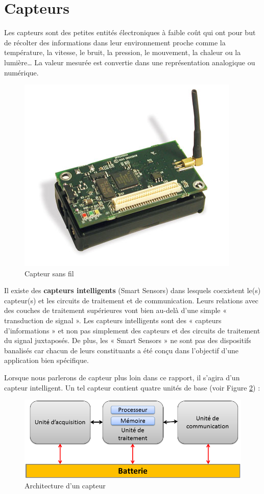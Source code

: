 \section{Capteurs}

Les capteurs sont des petites entités électroniques à faible coût qui ont pour but de récolter des informations dans leur environnement proche comme la température, la vitesse, le bruit, la pression, le mouvement, la chaleur ou la lumière… La valeur mesurée est convertie dans une représentation analogique ou numérique.

\begin{figure}[h]
\centering
\includegraphics[scale=0.3]{Intro/imageCapteur}
\caption{\label{imageCapteur} Capteur sans fil}
\end{figure}

Il existe des \textbf{capteurs intelligents} (Smart Sensors) dans lesquels coexistent le(s) capteur(s) et les circuits de traitement et de communication. Leurs relations avec des couches de traitement supérieures vont bien au-delà d’une simple « transduction de signal ». Les capteurs intelligents sont des « capteurs d’informations » et non pas simplement des capteurs et des circuits de traitement du signal juxtaposés. De plus, les « Smart Sensors » ne sont pas des dispositifs banalisés car chacun de leurs constituants a été conçu dans l’objectif d’une application bien spécifique.

Lorsque nous parlerons de capteur plus loin dans ce rapport, il s'agira d'un capteur intelligent. Un tel capteur contient quatre unités de base (voir Figure \ref{archiCapteur}) : 
 
 \begin{figure}[h]
\centering

\includegraphics[scale=0.5]{Intro/archiCapteur}
\caption{\label{archiCapteur} Architecture d’un capteur}
\end{figure}
 
